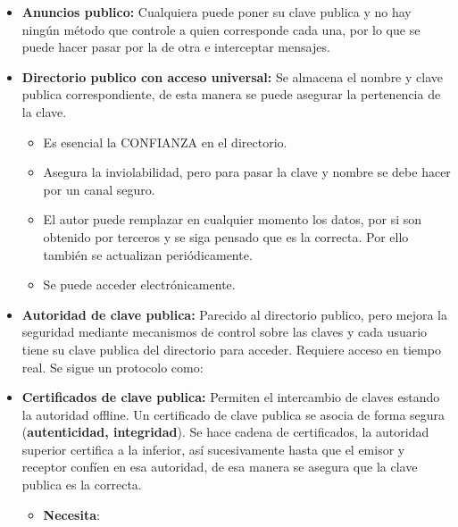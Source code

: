\documentclass[12pt, twoside, openright]{report} %
\begin{document}
\begin{itemize}
    \begin{itemize}
    \item \textbf{Anuncios publico:} Cualquiera puede poner su clave publica
      y no hay ningún método que controle a quien corresponde cada una,
      por lo que se puede hacer pasar por la de otra e interceptar
      mensajes.
      
    \item \textbf{Directorio publico con acceso universal:} Se almacena el
      nombre y clave publica correspondiente, de esta manera se puede
      asegurar la pertenencia de la clave.
      

      \begin{itemize}
      \item Es esencial la CONFIANZA en el directorio.
        
      \item Asegura la inviolabilidad, pero para pasar la clave y nombre se
        debe hacer por un canal seguro.
        
      \item El autor puede remplazar en cualquier momento los datos, por si
        son obtenido por terceros y se siga pensado que es la correcta.
        Por ello también se actualizan periódicamente.
        
      \item Se puede acceder electrónicamente.
        
      \end{itemize}
    \item \textbf{Autoridad de clave publica:} Parecido al directorio
      publico, pero mejora la seguridad mediante mecanismos de control
      sobre las claves y cada usuario tiene su clave publica del
      directorio para acceder. Requiere acceso en tiempo real. Se sigue
      un protocolo como:
      
    \item \textbf{Certificados de clave publica:} Permiten el intercambio de
      claves estando la autoridad offline. Un certificado de clave
      publica se asocia de forma segura (\textbf{autenticidad,
      integridad}). Se hace cadena de certificados, la autoridad
      superior certifica a la inferior, así sucesivamente hasta que el
      emisor y receptor confíen en esa autoridad, de esa manera se
      asegura que la clave publica es la correcta.
      

      \begin{itemize}
      \item \textbf{Necesita}:
        


\end{itemize}
\end{itemize}
\end{itemize}
\end{document}
